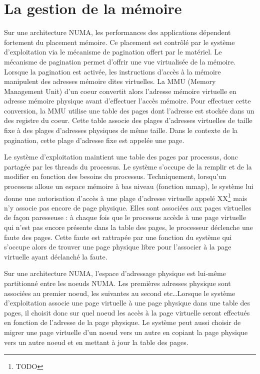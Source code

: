   \section{La gestion de la mémoire}

    Sur une architecture NUMA, les performances des applications dépendent
    fortement du placement mémoire. Ce placement est contrôlé par le système
    d'exploitation via le mécanisme de pagination offert par le matériel. Le
    mécanisme de pagination permet d'offrir une vue virtualisée de la
    mémoire. Lorsque la pagination est activée, les instructions d'accès à la
    mémoire manipulent des adresses mémoire dites virtuelles. La MMU (Memory
    Management Unit) d'un coeur convertit alors l'adresse mémoire virtuelle en
    adresse mémoire physique avant d'effectuer l'accès mémoire. Pour effectuer
    cette conversion, la MMU utilise une table des pages dont l'adresse est
    stockée dans un des registre du coeur. Cette table associe des plages
    d'adresses virtuelles de taille fixe à des plages d'adresses physiques de
    même taille. Dans le contexte de la pagination, cette plage d'adresse fixe
    est appelée une page.

    Le système d'exploitation maintient une table des pages par processus, donc
    partagée par les threads du processus. Le système s'occupe de la remplir et
    de la modifier en fonction des besoins du processus. Techniquement,
    lorsqu'un processus alloue un espace mémoire à bas niveau (fonction mmap),
    le système lui donne une autorisation d'accès à une plage d'adresse
    virtuelle appelé XX\footnote{TODO} mais n'y associe pas encore de page
    physique. Elles sont associées aux pages virtuelles de façon paresseuse : à
    chaque fois que le processus accède à une page virtuelle qui n'est pas
    encore présente dans la table des pages, le processeur déclenche une faute
    des pages. Cette faute est rattrapée par une fonction du système qui
    s'occupe alors de trouver une page physique libre pour l'associer à la page
    virtuelle ayant déclanché la faute.
  
    Sur une architecture NUMA, l'espace d'adressage physique est lui-même
    partitionné entre les noeuds NUMA. Les premières adresses physique sont
    associées au premier noeud, les suivantes au second etc\ldots Lorsque le
    système d'exploitation associe une page virtuelle à une page physique dans
    une table des pages, il choisit donc sur quel noeud les accès à la page
    virtuelle seront effectués en fonction de l'adresse de la page physique. Le
    système peut aussi choisir de migrer une page virtuelle d'un noeud vers un
    autre en copiant la page physique vers un autre noeud et en mettant à jour
    la table des pages.

